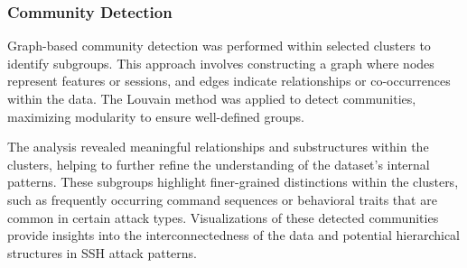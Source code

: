         \subsubsection{Community Detection \\}

            Graph-based community detection was performed within selected clusters to identify subgroups. This approach involves constructing a graph where nodes represent features or sessions, and edges indicate relationships or co-occurrences within the data. The Louvain method was applied to detect communities, maximizing modularity to ensure well-defined groups.

            The analysis revealed meaningful relationships and substructures within the clusters, helping to further refine the understanding of the dataset's internal patterns. These subgroups highlight finer-grained distinctions within the clusters, such as frequently occurring command sequences or behavioral traits that are common in certain attack types. Visualizations of these detected communities provide insights into the interconnectedness of the data and potential hierarchical structures in SSH attack patterns.      
        
